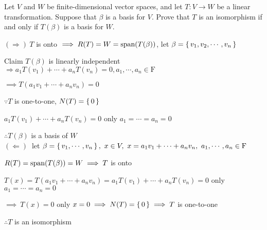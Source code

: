 Let $V$ and $W$ be finite-dimensional vector spaces, and let $T:V \rightarrow W$ be a linear transformation. Suppose that $\beta$ is a basis for $V$. Prove that $T$ is an isomorphism if and only if $T(\beta)$ is a basis for $W$.

\begin{tcolorbox}
	$(\Rightarrow)~ T$ is onto $\implies R(T) = W = \text{span($T(\beta)$)}$, let $\beta = \left\{ \,v_1,v_2,\cdots,v_n \,\right\}$
	
	Claim $T(\beta)$ is linearly independent $\Rightarrow a_1T(v_1) +\cdots + a_nT(v_n) = 0 , a_1,\cdots,a_n \in \mathrm{F}$
	
	$\implies T(a_1v_1+\cdots + a_nv_n) = 0 $
	
	$\because T$ is one-to-one, $N(T) = \left\{ \,0 \,\right\}$
	
	$a_1T(v_1) + \cdots + a_nT(v_n)=0$ only $a_1=\cdots = a_n = 0$ 
	
	$\therefore T(\beta)$ is a basis of $W$\\ 
	
	$(\Leftarrow)~ $ let $\beta = \left\{ \,v_1,\cdots,v_n \,\right\},~x \in V,~x = a_1v_1+\cdots+a_nv_n,~a_1,\cdots,a_n \in \mathrm{F}$
	
	$R(T) = \text{span($T(\beta)$)} = W \implies T$ is onto
	
	$T(x) = T(a_1v_1+\cdots+a_nv_n) = a_1T(v_1)+\cdots+a_nT(v_n)=0$ only $a_1=\cdots=a_n=0$
	
	$\implies~ T(x)=0$ only $x=0 \implies N(T) = \left\{ \,0 \,\right\} \implies T$ is one-to-one
	
	$\therefore T$ is an isomorphism
	
	
\end{tcolorbox}